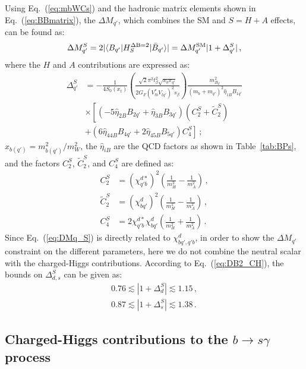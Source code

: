 \documentclass[prd,preprint,superscriptaddress,amsmath,amssymb]{revtex4}
\begin{document}
Using Eq.~(\ref{eq:mbWCs}) and the hadronic matrix elements shown in Eq.~(\ref{eq:BBmatrix}), the $\Delta M_{q'}$, which combines the SM and $S=H+A$ effects, can be found as:
%
\begin{equation}
 \Delta M^{S}_{q'} = 2 | \langle B_{q'}| H^{\rm \Delta B=2}_{S} | \bar B_{q'} \rangle|=\Delta M^{\rm SM}_{q'} |1+\Delta^{S}_{q'}|\,,
 \label{eq:DMq_S}
 \end{equation}
 where    the $H$ and $A$ contributions are expressed as:
 \begin{align}
 \Delta^S_{q'} &= - \frac{1}{4 S_0(x_t)} \left( \frac{\sqrt{2} \pi^2 t^2_\beta \sqrt{ x_b x_{q'} } }{2G_F (V^*_{tb} V_{tq'} )^2 s_\beta}\right) \frac{m^2_{B_{q'}}}{ (m_b + m_{q'} )^2 \hat\eta_{1B} B_{1q'}}\nonumber \\
 & \times \left[ \left(-5 \hat\eta_{2B} B_{2 q'} + \hat\eta_{3B} B_{3q'}  \right) \left(C^S_2  + \tilde{C}^S_2 \right) \right. \nonumber \\
 & \left. + \left(6\hat\eta_{44B} B_{4q'} + 2 \hat\eta_{45B} B_{5q'} \right) C^S_4  \right]\,;
 \end{align}
$x_{b(q')}=m^2_{b(q')}/m^2_W$, the $\hat\eta_{iB}$ are the QCD factors as shown in Table~\ref{tab:BPs}, and the factors $C^S_2$, $\tilde{C}^S_2$, and $C^S_4$ are defined as:
\begin{align}
 C^S_{2}   & =  (\chi^{d*}_{q' b})^2  \left( \frac{1}{m^2_H} - \frac{1}{m^2_A}\right)  \,, \nonumber \\
 \tilde{C}^S_2 & =  (\chi^d_{bq'})^2 \left( \frac{1}{m^2_H} - \frac{1}{m^2_A}\right) \,, \nonumber \\
 C^S_4 & = 2 \chi^{d*}_{q' b} \chi^d_{b q'} \left( \frac{1}{m^2_H} + \frac{1}{m^2_A}\right)\,.
\end{align}
Since  Eq.~(\ref{eq:DMq_S})  is directly related to $\chi^d_{bq',q'b}$, in order to show the $\Delta M_{q'}$ constraint on the different parameters,  here we do not combine the neutral scalar with  the charged-Higgs contributions.  According to Eq.~(\ref{eq:DB2_CH}), the bounds on $\Delta^S_{d,s}$ can be given as:
\begin{align}
 0.76 \lesssim |1+ \Delta^{S}_d | \lesssim 1.15 \,, \nonumber \\
 0.87 \lesssim |1+ \Delta^{S}_s | \lesssim 1.38 \,. 
 \end{align}


\subsection{ Charged-Higgs contributions to the $b\to s \gamma$ process} 
\end{document}
